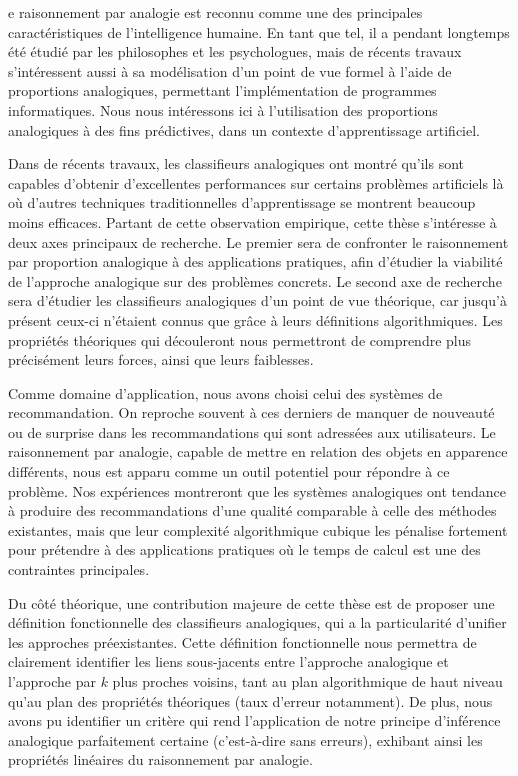 e raisonnement par analogie est reconnu comme une des principales
caractéristiques de l'intelligence humaine. En tant que tel, il a pendant
longtemps été étudié par les philosophes et les psychologues, mais de récents
travaux s'intéressent aussi à sa modélisation d'un point de vue formel à l'aide
de proportions analogiques, permettant l'implémentation de programmes
informatiques. Nous nous intéressons ici à l'utilisation des proportions
analogiques à des fins prédictives, dans un contexte d'apprentissage
artificiel.

Dans de récents travaux, les classifieurs analogiques ont montré qu'ils sont
capables d'obtenir d'excellentes performances sur certains problèmes
artificiels là où d'autres techniques traditionnelles d'apprentissage se montrent
beaucoup moins efficaces. Partant de cette observation empirique, cette thèse
s'intéresse à deux axes principaux de recherche.  Le premier sera de confronter
le raisonnement par proportion analogique à des applications pratiques, afin
d'étudier la viabilité de l'approche analogique sur des problèmes concrets.
Le second axe de recherche sera d'étudier les classifieurs analogiques d'un
point de vue théorique, car jusqu'à présent ceux-ci n'étaient connus que grâce
à leurs définitions algorithmiques. Les propriétés théoriques qui découleront
nous permettront de comprendre plus précisément leurs forces, ainsi que leurs
faiblesses.

Comme domaine d'application, nous avons choisi celui des systèmes de
recommandation. On reproche souvent à ces derniers de manquer de nouveauté ou
de surprise dans les recommandations qui sont adressées aux utilisateurs. Le
raisonnement par analogie, capable de mettre en relation des objets en
apparence différents, nous est apparu comme un outil potentiel pour répondre à
ce problème. Nos expériences montreront que les systèmes analogiques ont
tendance à produire des recommandations d'une qualité comparable à celle des
méthodes existantes, mais que leur complexité algorithmique cubique les
pénalise fortement pour prétendre à des applications pratiques où le temps de
calcul est une des contraintes principales.

Du côté théorique, une contribution majeure de cette thèse est de proposer une
définition fonctionnelle des classifieurs analogiques, qui a la particularité
d'unifier les approches préexistantes. Cette définition fonctionnelle nous
permettra de clairement identifier les liens sous-jacents entre l'approche
analogique et l'approche par $k$ plus proches voisins, tant au plan
algorithmique de haut niveau qu'au plan des propriétés théoriques (taux
d'erreur notamment). De plus, nous avons pu identifier un critère
qui rend l'application de notre principe d'inférence analogique parfaitement
certaine (c'est-à-dire sans erreurs),  exhibant ainsi les propriétés linéaires
du raisonnement par analogie.
